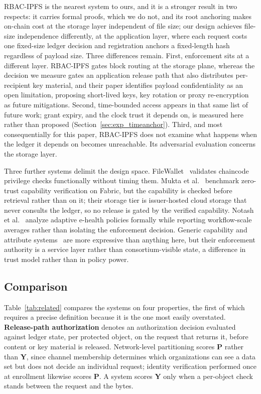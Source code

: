 \documentclass[preprint,12pt]{elsarticle}
\begin{document}
RBAC-IPFS is the nearest system to ours, and it is a stronger result in two
respects: it carries formal proofs, which we do not, and its root anchoring
makes on-chain cost at the storage layer independent of file size; our
design achieves file-size independence differently, at the application layer,
where each request costs one fixed-size ledger decision and registration
anchors a fixed-length hash regardless of payload size. Three
differences remain. First, enforcement sits at a different layer. RBAC-IPFS
gates block routing at the storage plane, whereas the decision we measure gates
an application release path that also distributes per-recipient key material,
and their paper identifies
payload confidentiality as an open limitation, proposing short-lived keys, key
rotation or proxy re-encryption as future mitigations. Second, time-bounded
access appears in that same list of future work; grant expiry, and the clock
trust it depends on, is measured here rather than proposed
(Section~\ref{sec:exp_timeanchor}). Third, and most consequentially for this
paper, RBAC-IPFS does not examine what happens when the ledger it depends on
becomes unreachable. Its adversarial evaluation concerns the storage layer.

Three further systems delimit the design space. FileWallet~\cite{chen2022filewallet} validates
chaincode privilege checks functionally without timing them. Mukta et
al.~\cite{mukta2026zerotrust} benchmark zero-trust capability verification on
Fabric, but the capability is checked before retrieval rather than on it;
their storage tier is issuer-hosted cloud storage that never consults the
ledger, so no release is gated by the verified capability. Notash et al.~\cite{notash2026adaptive} analyze adaptive
e-health policies formally while reporting workflow-scale averages rather than
isolating the enforcement decision. Generic capability and attribute
systems~\cite{macaroons2014,zanzibar2019,hu2014guide} are more expressive than
anything here, but their enforcement authority is a service layer rather than
consortium-visible state, a difference in trust model rather than in policy
power.

\subsection{Comparison}
\label{sec:comparison}

Table~\ref{tab:related} compares the systems on four properties, the first
of which requires a precise definition because it is the one most easily
overstated. \textbf{Release-path authorization} denotes an authorization
decision evaluated against ledger state, per protected object, on the request
that returns it, before content or key material is released. Network-level
partitioning scores \textbf{P} rather than \textbf{Y}, since channel
membership determines which organizations can see a data set but does not
decide an individual request; identity verification performed once at
enrollment likewise scores \textbf{P}. A system scores \textbf{Y} only when a
per-object check stands between the request and the bytes.
\end{document}
